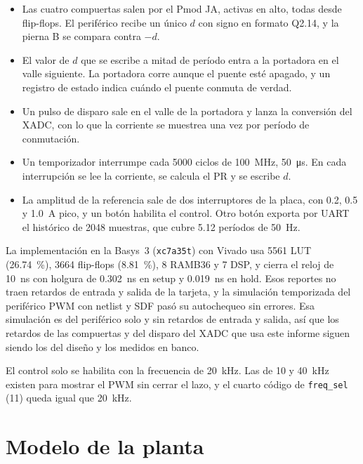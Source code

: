 \documentclass[journal]{IEEEtran}
\begin{document}
\begin{itemize}
	\item Las cuatro compuertas salen por el Pmod JA, activas en alto, todas desde flip-flops. El periférico recibe un único $d$ con signo en formato Q2.14, y la pierna B se compara contra $-d$.
	\item El valor de $d$ que se escribe a mitad de período entra a la portadora en el valle siguiente. La portadora corre aunque el puente esté apagado, y un registro de estado indica cuándo el puente conmuta de verdad.
	\item Un pulso de disparo sale en el valle de la portadora y lanza la conversión del XADC, con lo que la corriente se muestrea una vez por período de conmutación.
	\item Un temporizador interrumpe cada \num{5000} ciclos de \SI{100}{MHz}, \SI{50}{\micro s}. En cada interrupción se lee la corriente, se calcula el PR y se escribe $d$.
	\item La amplitud de la referencia sale de dos interruptores de la placa, con \num{0.2}, \num{0.5} y \SI{1.0}{A} pico, y un botón habilita el control. Otro botón exporta por UART el histórico de \num{2048} muestras, que cubre \num{5.12} períodos de \SI{50}{Hz}.
\end{itemize}

La implementación en la Basys~3 (\texttt{xc7a35t}) con Vivado usa \num{5561} LUT (\SI{26.74}{\percent}), \num{3664} flip-flops (\SI{8.81}{\percent}), \num{8} RAMB36 y \num{7} DSP, y cierra el reloj de \SI{10}{ns} con holgura de \SI{0.302}{ns} en setup y \SI{0.019}{ns} en hold. Esos reportes no traen retardos de entrada y salida de la tarjeta, y la simulación temporizada del periférico PWM con netlist y SDF pasó su autochequeo sin errores. Esa simulación es del periférico solo y sin retardos de entrada y salida, así que los retardos de las compuertas y del disparo del XADC que usa este informe siguen siendo los del diseño y los medidos en banco.

El control solo se habilita con la frecuencia de \SI{20}{kHz}. Las de \num{10} y \SI{40}{kHz} existen para mostrar el PWM sin cerrar el lazo, y el cuarto código de \texttt{freq\_sel} (11) queda igual que \SI{20}{kHz}.

\section{Modelo de la planta}
\label{sec:modelo}
\end{document}
